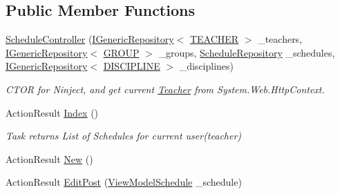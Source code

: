 \subsection*{Public Member Functions}
\begin{DoxyCompactItemize}
\item 
\hyperlink{class_in_study_asp_1_1_controllers_1_1_user_1_1_teacher_1_1_schedule_controller_aa5f4315593095a1c5065795fbf082a6c}{Schedule\+Controller} (\hyperlink{interface_repo_1_1_common_1_1_i_generic_repository}{I\+Generic\+Repository}$<$ \hyperlink{class_e_f_oracle_1_1_model_1_1_t_e_a_c_h_e_r}{T\+E\+A\+C\+H\+ER} $>$ \+\_\+teachers, \hyperlink{interface_repo_1_1_common_1_1_i_generic_repository}{I\+Generic\+Repository}$<$ \hyperlink{class_e_f_oracle_1_1_model_1_1_g_r_o_u_p}{G\+R\+O\+UP} $>$ \+\_\+groups, \hyperlink{class_repo_1_1_schedule_repository}{Schedule\+Repository} \+\_\+schedules, \hyperlink{interface_repo_1_1_common_1_1_i_generic_repository}{I\+Generic\+Repository}$<$ \hyperlink{class_e_f_oracle_1_1_model_1_1_d_i_s_c_i_p_l_i_n_e}{D\+I\+S\+C\+I\+P\+L\+I\+NE} $>$ \+\_\+disciplines)
\begin{DoxyCompactList}\small\item\em C\+T\+OR for Ninject, and get current \hyperlink{namespace_in_study_asp_1_1_controllers_1_1_user_1_1_teacher}{Teacher} from System.\+Web.\+Http\+Context. \end{DoxyCompactList}\item 
Action\+Result \hyperlink{class_in_study_asp_1_1_controllers_1_1_user_1_1_teacher_1_1_schedule_controller_a56b0d71c5c5639e0a9bd708a3535af6c}{Index} ()
\begin{DoxyCompactList}\small\item\em Task returns List of Schedules for current user(teacher) \end{DoxyCompactList}\item 
Action\+Result \hyperlink{class_in_study_asp_1_1_controllers_1_1_user_1_1_teacher_1_1_schedule_controller_aeaefe8512d47c31ed3afea285cae647d}{New} ()
\begin{DoxyCompactList}\small\item\em \begin{DoxyVerb}\end{DoxyVerb}
 \end{DoxyCompactList}\item 
Action\+Result \hyperlink{class_in_study_asp_1_1_controllers_1_1_user_1_1_teacher_1_1_schedule_controller_a8460ca79030e193cfb5367a0b51f6933}{Edit\+Post} (\hyperlink{class_in_study_asp_1_1_models_1_1_user_1_1_teacher_1_1_view_model_schedule}{View\+Model\+Schedule} \+\_\+schedule)

\end{DoxyCompactItemize}
